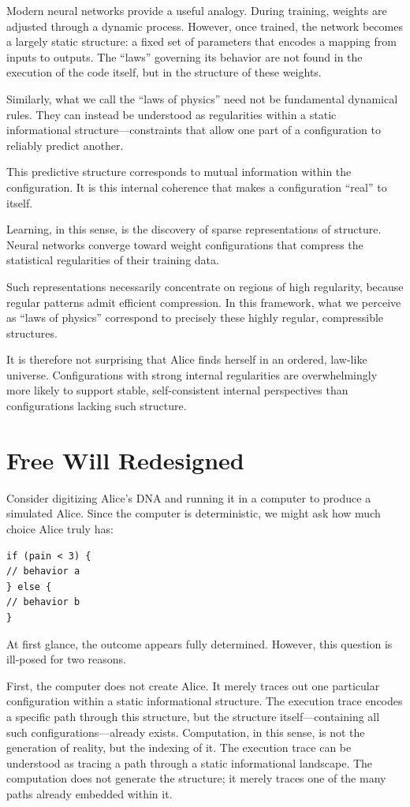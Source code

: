 Modern neural networks provide a useful analogy. During training, weights are adjusted through a dynamic process. However, once trained, the network becomes a largely static structure: a fixed set of parameters that encodes a mapping from inputs to outputs. The “laws” governing its behavior are not found in the execution of the code itself, but in the structure of these weights.

Similarly, what we call the “laws of physics” need not be fundamental dynamical rules. They can instead be understood as regularities within a static informational structure—constraints that allow one part of a configuration to reliably predict another.

This predictive structure corresponds to mutual information within the configuration. It is this internal coherence that makes a configuration “real” to itself. 

Learning, in this sense, is the discovery of sparse representations of structure. Neural networks converge toward weight configurations that compress the statistical regularities of their training data.

Such representations necessarily concentrate on regions of high regularity, because regular patterns admit efficient compression. In this framework, what we perceive as “laws of physics” correspond to precisely these highly regular, compressible structures.

It is therefore not surprising that Alice finds herself in an ordered, law-like universe. Configurations with strong internal regularities are overwhelmingly more likely to support stable, self-consistent internal perspectives than configurations lacking such structure.


\section{Free Will Redesigned}

Consider digitizing Alice’s DNA and running it in a computer to produce a simulated Alice. Since the computer is deterministic, we might ask how much choice Alice truly has:

\begin{verbatim}
if (pain < 3) {
// behavior a
} else {
// behavior b
}
\end{verbatim}

At first glance, the outcome appears fully determined. However, this question is ill-posed for two reasons.

First, the computer does not create Alice. It merely traces out one particular configuration within a static informational structure. The execution trace encodes a specific path through this structure, but the structure itself—containing all such configurations—already exists. Computation, in this sense, is not the generation of reality, but the indexing of it. The execution trace can be understood as tracing a path through a static informational landscape. The computation does not generate the structure; it merely traces one of the many paths already embedded within it.

